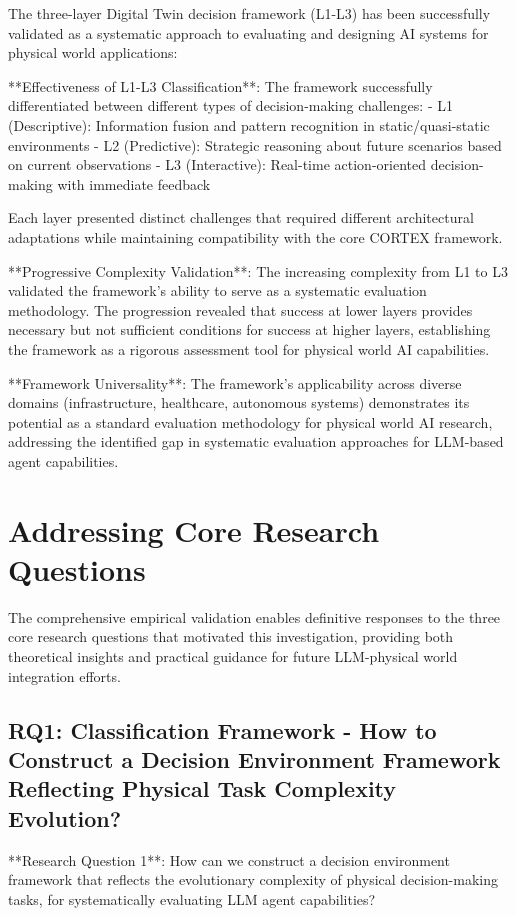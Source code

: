 The three-layer Digital Twin decision framework (L1-L3) has been successfully validated as a systematic approach to evaluating and designing AI systems for physical world applications:

**Effectiveness of L1-L3 Classification**: The framework successfully differentiated between different types of decision-making challenges:
- L1 (Descriptive): Information fusion and pattern recognition in static/quasi-static environments
- L2 (Predictive): Strategic reasoning about future scenarios based on current observations
- L3 (Interactive): Real-time action-oriented decision-making with immediate feedback

Each layer presented distinct challenges that required different architectural adaptations while maintaining compatibility with the core CORTEX framework.

**Progressive Complexity Validation**: The increasing complexity from L1 to L3 validated the framework's ability to serve as a systematic evaluation methodology. The progression revealed that success at lower layers provides necessary but not sufficient conditions for success at higher layers, establishing the framework as a rigorous assessment tool for physical world AI capabilities.

**Framework Universality**: The framework's applicability across diverse domains (infrastructure, healthcare, autonomous systems) demonstrates its potential as a standard evaluation methodology for physical world AI research, addressing the identified gap in systematic evaluation approaches for LLM-based agent capabilities.

\section{Addressing Core Research Questions}

The comprehensive empirical validation enables definitive responses to the three core research questions that motivated this investigation, providing both theoretical insights and practical guidance for future LLM-physical world integration efforts.

\subsection{RQ1: Classification Framework - How to Construct a Decision Environment Framework Reflecting Physical Task Complexity Evolution?}

**Research Question 1**: How can we construct a decision environment framework that reflects the evolutionary complexity of physical decision-making tasks, for systematically evaluating LLM agent capabilities?

